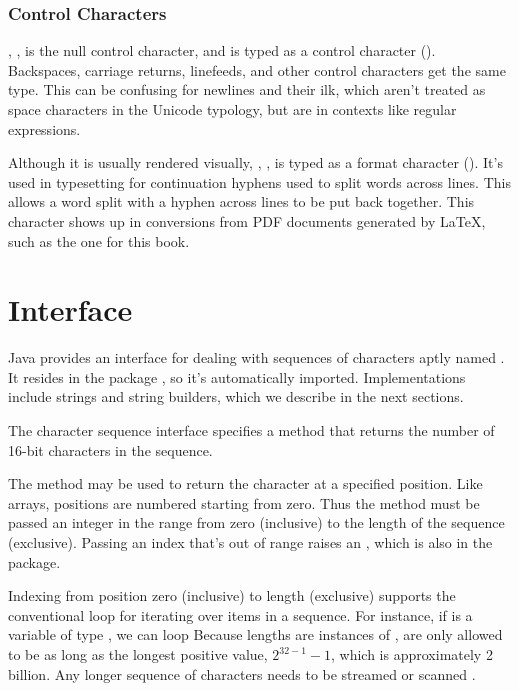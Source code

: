 \subsubsection{Control Characters}

, , is the null control
character, and is typed as a control character ().
Backspaces, carriage returns, linefeeds, and other control characters
get the same type.  This can be confusing for newlines and their ilk,
which aren't treated as space characters in the Unicode typology, but
are in contexts like regular expressions.

Although it is usually rendered visually, ,
, is typed as a format character ().
It's used in typesetting for continuation hyphens used to split words
across lines.  This allows a word split with a hyphen across lines to
be put back together.  This character shows up in conversions from PDF
documents generated by \LaTeX, such as the one for this book.



\section{ Interface}

Java provides an interface for dealing with sequences of characters
aptly named .  It resides in the package
, so it's automatically imported.  Implementations
include strings and string builders, which we describe in the next
sections.

The character sequence interface specifies a method 
that returns the number of 16-bit characters in the sequence.  

The method  may be used to return the character at a
specified position.  Like arrays, positions are numbered
starting from zero.  Thus the method must be passed an integer in the
range from zero (inclusive) to the length of the sequence (exclusive).
Passing an index that's out of range raises an
, which is also in the
 package.

Indexing from position zero (inclusive) to length (exclusive) supports
the conventional  loop for iterating over items in a sequence.
For instance, if  is a variable of type ,
we can loop
%
%
Because lengths are instances of , are only allowed to be as
long as the longest positive  value, $2^{32-1} - 1$, which
is approximately 2 billion.  Any longer sequence of characters needs
to be streamed  or scanned
.

